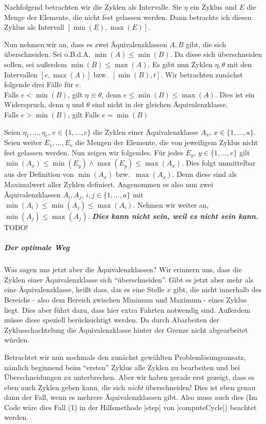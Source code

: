 Nachfolgend betrachten wir die Zyklen als Intervalle. Sie $\eta$ ein Zyklus und $E$ die Menge der Elemente, die nicht fest gelassen werden.
Dann betrachte ich diesen Zyklus als Intervall $[\min(E), \max(E)]$.

Nun nehmen wir an, dass es zwei Äquivalenzklassen $A,B$ gibt, die sich überschneiden.
Sei o.B.d.A. $\min(A) \leq \min(B)$. Da diese sich überschneiden sollen, sei außerdem $\min(B) \leq \max(A)$.
Es gibt nun Zyklen $\eta, \theta$ mit den Intervallen $[e, \max(A)]$ bzw.\ $[\min(B), t]$.
Wir betrachten zunächst folgende drei Fälle für $e$. \\
Falls $e < \min(B)$, gilt $\eta \equiv \theta$, denn $e \leq \min(B) \leq \max(A)$.
Dies ist ein Widerspruch, denn $\eta$ und $\theta$ sind nicht in der gleichen Äquivalenzklasse.\\
Falls $e > \min(B)$, gilt 
Falls $e = \min(B)$

Seien $\eta_1, \dots, \eta_e$, $e \in \{1,\dots, c\}$ die Zyklen einer Äquivalenzklasse $A_x$, $x \in \{1, \dots, a\}$.
Seien weiter $E_1, \dots, E_e$ die Mengen der Elemente, die von jeweiligem Zyklus nicht fest gelassen werden.
Nun zeigen wir folgendes. Für jedes $E_y$, $y \in \{1, \dots, e\}$ gilt $\min(A_x) \leq \min(E_y) \wedge \max(E_y) \leq \max(A_x)$.
Dies folgt unmittelbar aus der Definition von $\min(A_x)$ bzw.\ $\max(A_x)$. Denn diese sind als Maximalwert aller Zyklen definiert.
Angenommen es also nun zwei Äquivalenzklassen $A_i, A_j$, $i,j \in \{1, \dots, a\}$ mit $\min(A_i) \leq \min(A_j) \leq \max(A_i)$.
Nehmen wir weiter an, $\min(A_j) \leq \max(A_j)$. \emph{\textbf{Dies kann nicht sein, weil es nicht sein kann.}} TODO!

\subparagraph{Der optimale Weg}
Was sagen uns jetzt aber die Äquivalenzklassen? Wir erinnern uns, dass die Zyklen einer Äquivalenzklasse sich ``überschneiden''.
Gibt es jetzt aber mehr als eine Äquivalenzklasse, heißt dass, das es eine Stelle $x$ gibt, die nicht innerhalb des Bereichs - also dem Bereich zwischen Minimum und Maximum - eines Zyklus liegt.
Dies aber führt dazu, dass hier extra Fahrten notwendig sind. Außerdem müsse diese speziell berücksichtigt werden.
Da durch Abarbeiten der Zyklusschachtelung die Äquivalenzklasse hinter der Grenze nicht abgearbeitet würden. 

Betrachtet wir nun nochmals den zunächst gewählten Problemlösungsansatz, nämlich beginnend beim ``ersten'' Zyklus alle Zyklen zu bearbeiten und bei Überschneidungen zu unterbrechen.
Aber wir haben gerade erst gezeigt, dass es eben auch Zyklen geben kann, die sich \emph{nicht} überschneiden!
Dies ist eben genau dann der Fall, wenn es mehrere Äquivalenzklassen gibt.
Also muss auch dies (Im Code wäre dies Fall (1) in der Hilfsmethode |step| von |computeCycle|) beachtet werden.

